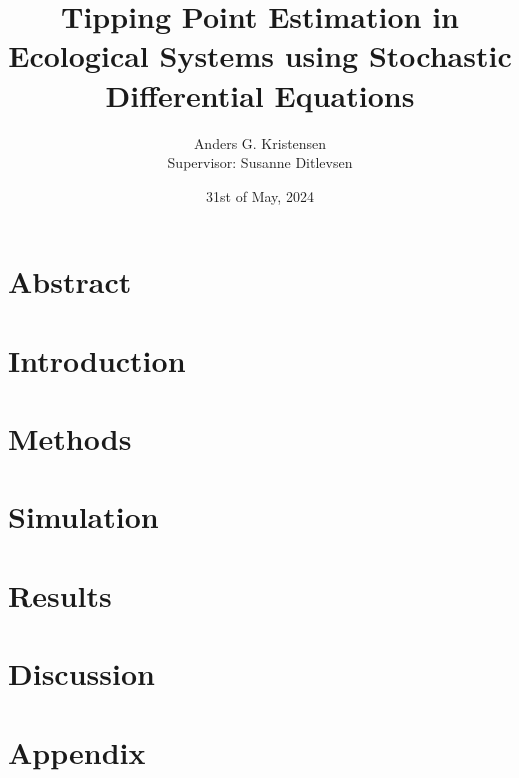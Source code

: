 \documentclass[11pt]{article}
\begin{document}
\pagestyle{fancy}
\fancyfoot{}
\fancyfoot[C]{\thepage}
\fancyhead[C]{}
\fancyhead[L]{}
\fancyhead[R]{}
\renewcommand{\headrulewidth}{0pt}
\renewcommand{\footrulewidth}{0pt}
\allowdisplaybreaks



\title{Tipping Point Estimation in Ecological Systems using Stochastic Differential Equations}
\author{Anders G. Kristensen \\
Supervisor: Susanne Ditlevsen}
\date{31st of May, 2024}
\maketitle
\section*{Abstract}\label{Abstract}

\newpage
\tableofcontents
\section{Introduction}\label{Introduction}

\section{Methods}\label{Methods}

\section{Simulation}\label{Simulation}

\section{Results}\label{Results}

\section{Discussion}\label{Discussion}

\newpage

\newpage
\appendix
\section*{Appendix}\label{Appendix}

\end{document}
